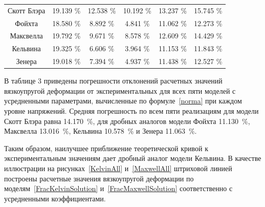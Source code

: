 \documentclass[11pt,a4paper,twoside]{article}
\begin{document}
\begin{center}
\begin{tabular}{|c||c|c|c|c|c|}
			\hline 


			\rule{0mm}{12pt}%


			Скотт Блэра & 19.139 \% & 12.538 \% & 10.192 \% & 13.237 \% & 15.745 \%  \\


			Фойхта & 18.580 \% & \phantom{1}8.892 \% & \phantom{1}4.841 \% & 11.062 \% & 12.273 \%\\ 


			Максвелла & 19.792 \% & \phantom{1}9.671 \% & \phantom{1}8.578 \% & 12.609 \% & 14.429 \%\\


			Кельвина & 19.325 \% & \phantom{1}6.606 \% & \phantom{1}3.964 \% & 11.153 \% & 11.843 \%\\


			Зенера & 19.018 \% & \phantom{1}7.394 \% & \phantom{1}4.937 \% & 11.438 \% & 12.527 \%\\			


			\hline


		\end{tabular}





\end{center}

















В таблице 3 приведены погрешности отклонений расчетных значений вязкоупругой деформации от экспериментальных для всех пяти моделей с усредненными параметрами, вычисленные по формуле~\eqref{norma} при каждом уровне напряжений. Средняя погрешность по всем пяти реализациям для модели Скотт Блэра равна 14.170~\%, для дробных аналогов модели Фойхта 11.130~\%, Максвелла 13.016~\%, Кельвина 10.578~\% и Зенера 11.063~\%. 


Таким образом, наилучшее приближение теоретической кривой к экспериментальным значениям дает дробный аналог модели Кельвина. В качестве иллюстрации на рисунках~\ref{KelvinAll} и~\ref{MaxwellAll} штриховой линией построены расчетные значения вязкоупругой деформации по моделям~\eqref{FracKelvinSolution} и~\eqref{FracMaxwellSolution} соответственно с усредненными коэффициентами.
\end{document}
